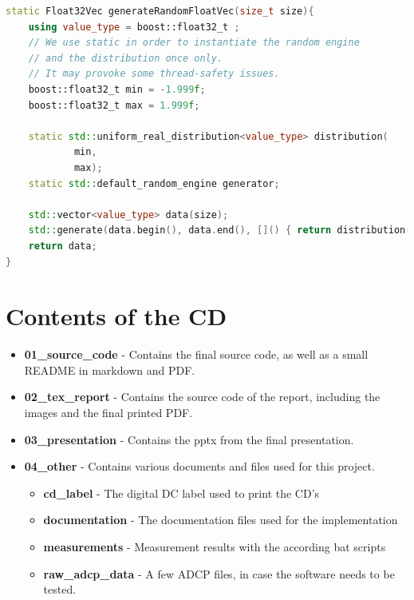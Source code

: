 \begin{lstlisting}[language=C++]
static Float32Vec generateRandomFloatVec(size_t size){
    using value_type = boost::float32_t ;
    // We use static in order to instantiate the random engine
    // and the distribution once only.
    // It may provoke some thread-safety issues.
    boost::float32_t min = -1.999f;
    boost::float32_t max = 1.999f;

    static std::uniform_real_distribution<value_type> distribution(
            min,
            max);
    static std::default_random_engine generator;

    std::vector<value_type> data(size);
    std::generate(data.begin(), data.end(), []() { return distribution(generator); });
    return data;
}
\end{lstlisting}
\chapter{Contents of the CD}
\begin{itemize}
\item\textbf{01\_source\_code} - Contains the final source code, as well as a small README in markdown and PDF.
\item\textbf{02\_tex\_report} - Contains the source code of the report, including the images and the final printed PDF.
\item\textbf{03\_presentation} - Contains the pptx from the final presentation.
\item \textbf{04\_other} - Contains various documents and files used for this project.
	\begin{itemize}
		\item \textbf{cd\_label} - The digital DC label used to print the CD's
		\item \textbf{documentation} - The documentation files used for the implementation	
		\item \textbf{measurements} - Measurement results with the according bat scripts
		\item \textbf{raw\_adcp\_data} - A few ADCP files, in case the software needs to be tested.
	\end{itemize}
\end{itemize}
